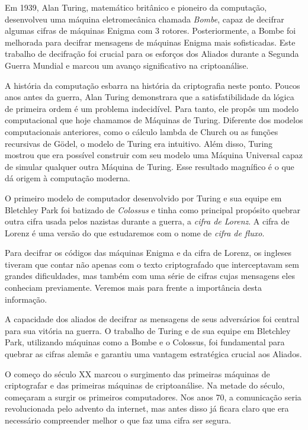 Em 1939, Alan Turing, matemático britânico e pioneiro da computação, desenvolveu uma máquina eletromecânica chamada {\em Bombe}, capaz de decifrar algumas cifras de máquinas Enigma com 3 rotores.
Posteriormente, a Bombe foi melhorada para decifrar mensagens de máquinas Enigma mais sofisticadas.
Este trabalho de decifração foi crucial para os esforços dos Aliados durante a Segunda Guerra Mundial e marcou um avanço significativo na criptoanálise.

A história da computação esbarra na história da criptografia neste ponto.
Poucos anos antes da guerra, Alan Turing demonstrara que a satisfatibilidade da lógica de primeira ordem é um problema indecidível.
Para tanto, ele propôs um modelo computacional que hoje chamamos de Máquinas de Turing.
Diferente dos modelos computacionais anteriores, como o cálculo lambda de Church ou as funções recursivas de Gödel, o modelo de Turing era intuitivo.
Além disso, Turing mostrou que era possível construir com seu modelo uma Máquina Universal capaz de simular qualquer outra Máquina de Turing.
Esse resultado magnífico é o que dá origem à computação moderna.

O primeiro modelo de computador desenvolvido por Turing e sua equipe em Bletchley Park foi batizado de {\em Colossus} e tinha como principal propósito quebrar outra cifra usada pelos nazistas durante a guerra, a {\em cifra de Lorenz}.
A cifra de Lorenz é uma versão do que estudaremos com o nome de {\em cifra de fluxo}.

Para decifrar os códigos das máquinas Enigma e da cifra de Lorenz, os ingleses tiveram que contar não apenas com o texto criptografado que interceptavam sem grandes dificuldades, mas também com uma série de cifras cujas mensagens eles conheciam previamente.
Veremos mais para frente a importância desta informação.

A capacidade dos aliados de decifrar as mensagens de seus adversários foi central para sua vitória na guerra.
O trabalho de Turing e de sua equipe em Bletchley Park, utilizando máquinas como a Bombe e o Colossus, foi fundamental para quebrar as cifras alemãs e garantiu uma vantagem estratégica crucial aos Aliados.

O começo do século XX marcou o surgimento das primeiras máquinas de criptografar e das primeiras máquinas de criptoanálise.
Na metade do século, começaram a surgir os primeiros computadores.
Nos anos 70, a comunicação seria revolucionada pelo advento da internet, mas antes disso já ficara claro que era necessário compreender melhor o que faz uma cifra ser segura.

